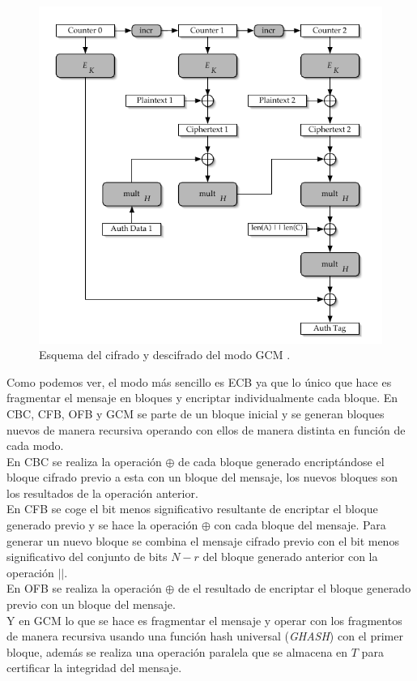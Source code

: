 \begin{itemize}
\begin{figure}[htb]
			\centering
			\includegraphics[scale=0.4]{imagenes/cgc.png} 
			\caption{Esquema del cifrado y descifrado del modo GCM \cite{gcm}.}
			\label{esquemaofb}
		\end{figure}
\end{itemize}
Como podemos ver, el modo más sencillo es ECB ya que lo único que hace es fragmentar el mensaje en bloques y encriptar individualmente cada bloque. En CBC, CFB, OFB y GCM se parte de un bloque inicial y se generan bloques nuevos de manera recursiva operando con ellos de manera distinta en función de cada modo.\\ 
En CBC se realiza la operación $\oplus$ de cada bloque generado encriptándose el bloque cifrado previo a esta con un bloque del mensaje, los nuevos bloques son los resultados de la operación anterior.\\
En CFB se coge el bit menos significativo resultante de encriptar el bloque generado previo y se hace la operación $\oplus$ con cada bloque del mensaje. Para generar un nuevo bloque se combina el mensaje cifrado previo con el bit menos significativo del conjunto de bits $N-r$ del bloque generado anterior con la operación $||$.\\
En OFB se realiza la operación $\oplus$ de el resultado de encriptar el bloque generado previo con un bloque del mensaje.\\
Y en GCM lo que se hace es fragmentar el mensaje y operar con los fragmentos de manera recursiva usando una función hash universal (\emph{GHASH}) con el primer bloque, además se realiza una operación paralela que se almacena en $T$ para certificar la integridad del mensaje.\\
